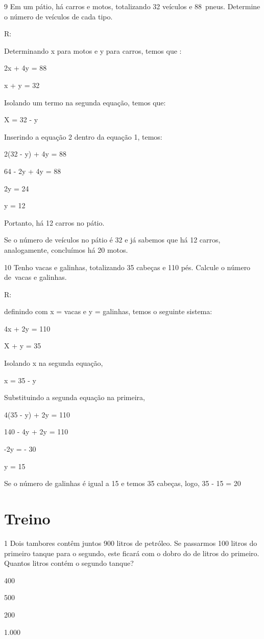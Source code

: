 {\num{9} Em um pátio, há carros e motos, totalizando 32 veículos e 88~pneus.
Determine o número de veículos de cada tipo.

R:

Determinando x para motos e y para carros, temos que :

2x + 4y = 88

x + y = 32

Isolando um termo na segunda equação, temos que:

X = 32 - y

Inserindo a equação 2 dentro da equação 1, temos:

2(32 - y) + 4y = 88

64 - 2y + 4y = 88

2y = 24

y = 12

Portanto, há 12 carros no pátio.

Se o número de veículos no pátio é 32 e já sabemos que há 12 carros,
analogamente, concluímos há 20 motos.

\num{10} Tenho vacas e galinhas, totalizando 35 cabeças e 110 pés. Calcule o
número de~vacas e galinhas.

R:

definindo com x = vacas e y = galinhas, temos o seguinte sistema:

4x + 2y = 110

X + y = 35

Isolando x na segunda equação,

x = 35 - y

Substituindo a segunda equação na primeira,

4(35 - y) + 2y = 110

140 - 4y + 2y = 110

-2y = - 30

y = 15

Se o número de galinhas é igual a 15 e temos 35 cabeças, logo, 35 - 15 =
20

\section{Treino}

\num{1} Dois tambores contêm juntos 900 litros de petróleo. Se passarmos 100
litros do primeiro tanque para o segundo, este ficará com o dobro do de
litros do primeiro. Quantos litros contém o segundo tanque?
\item 400
\item 500
\item 200
\item 1.000

}
